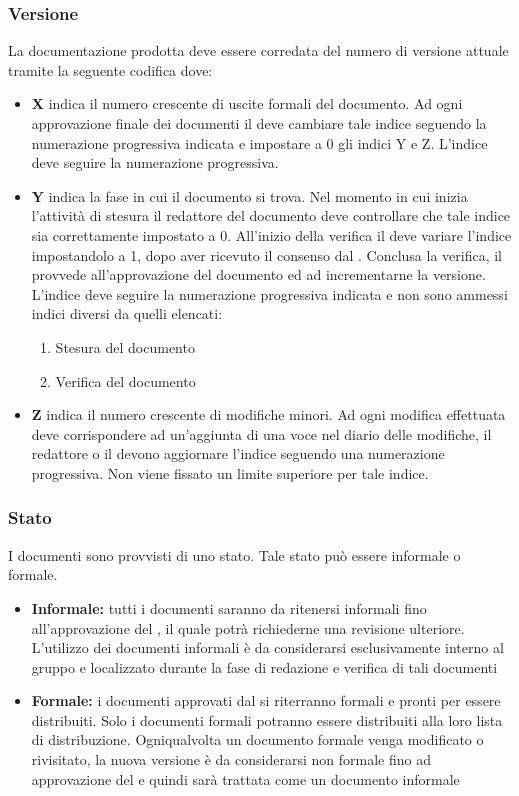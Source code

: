 \documentclass[12pt,a4paper]{article}
\begin{document}
\subsubsection{Versione} \label{Versione}
La documentazione prodotta deve essere corredata del numero di versione attuale tramite la seguente codifica  dove:
\begin{itemize}
	\item \textbf{X} indica il numero crescente di uscite formali del documento. Ad ogni approvazione finale dei documenti il \PM deve cambiare tale indice seguendo la numerazione progressiva indicata e impostare a 0 gli indici Y e Z. L'indice deve seguire la numerazione progressiva.
	\item \textbf{Y} indica la fase in cui il documento si trova. Nel momento in cui inizia l'attività di stesura il redattore del documento deve controllare che tale indice sia correttamente impostato a 0. All'inizio della verifica il \VR{} deve variare l'indice impostandolo a 1, dopo aver ricevuto il consenso dal \PM. Conclusa la verifica, il \PM{} provvede all'approvazione del documento ed ad incrementarne la versione. L'indice deve seguire la numerazione progressiva indicata e non sono ammessi indici diversi da quelli elencati:
	\begin{enumerate}[start=0]
		\item Stesura del documento
		\item Verifica del documento
	\end{enumerate}
\item \textbf{Z} indica il numero crescente di modifiche minori. Ad ogni modifica effettuata deve corrispondere ad un'aggiunta di una voce nel diario delle modifiche, il redattore o il \VR{} devono aggiornare l'indice seguendo una numerazione progressiva. Non viene fissato un limite superiore per tale indice.
\end{itemize}

\subsubsection{Stato}
I documenti sono provvisti di uno stato. Tale stato può essere informale o formale.

\begin{itemize}
	\item \textbf{Informale:} tutti i documenti saranno da ritenersi informali fino all'approvazione del \PM, il quale potrà richiederne una revisione ulteriore. L'utilizzo dei documenti informali è da considerarsi esclusivamente interno al gruppo e localizzato durante la fase di redazione e verifica di tali documenti
	\item \textbf{Formale:} i documenti approvati dal \PM{} si riterranno formali e pronti per essere distribuiti. Solo i documenti formali potranno essere distribuiti alla loro lista di distribuzione. Ogniqualvolta un documento formale venga modificato o rivisitato, la nuova versione è da considerarsi non formale fino ad approvazione del \PM e quindi sarà trattata come un documento informale
\end{itemize}
\end{document}
